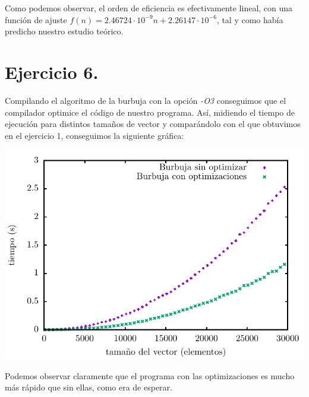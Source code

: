 \documentclass[11pt,a4paper]{article}
\begin{document}
Como podemos observar, el orden de eficiencia es efectivamente lineal, con una función de ajuste $f(n) = 2.46724 \cdot 10^{-9}n + 2.26147 \cdot 10^{-6}$, tal y como había predicho nuestro estudio teórico.

\section*{Ejercicio 6.}

Compilando el algoritmo de la burbuja con la opción \textit{-O3} conseguimos que el compilador optimice el código de nuestro programa. Así, midiendo el tiempo de ejecución para distintos tamaños de vector y comparándolo con el que obtuvimos en el ejercicio 1, conseguimos la siguiente gráfica:

\begin{center}
	\includegraphics{img/tiempos_burbuja_opt_compilador.pdf}
\end{center}

Podemos observar claramente que el programa con las optimizaciones es mucho más rápido que sin ellas, como era de esperar.
\end{document}
